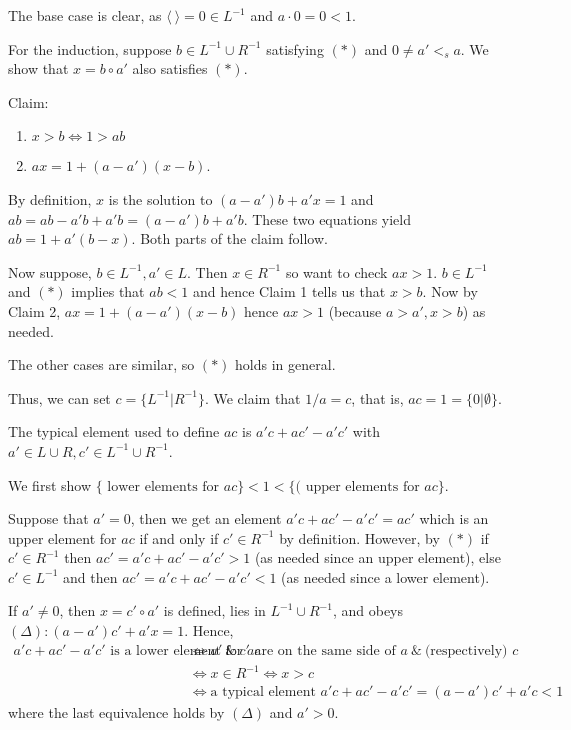The base case is clear, as $\langle \ \rangle = 0\in L^{-1}$ and $a\cdot 0 = 0 < 1$.

For the induction, suppose $b\in L^{-1}\cup R^{-1}$ satisfying $(*)$ and $0\neq a' <_s a$. We show that $x = b\circ a'$ also satisfies $(*)$.

Claim:
\begin{enumerate}
\item $x > b \Leftrightarrow 1 > ab$
\item $ax = 1 + (a-a')(x-b)$.
\end{enumerate}
By definition, $x$ is the solution to $(a-a')b + a'x = 1$ and $ab = ab - a'b + a'b = (a-a')b + a'b$. These two equations yield $ab = 1 + a'(b-x)$. Both parts of the claim follow.

Now suppose, $b\in L^{-1}, a'\in L$. Then $x\in R^{-1}$ so want to check $ax > 1$.
$b\in L^{-1}$ and $(*)$ implies that $ab < 1$ and hence Claim 1 tells us that $x > b$. Now by Claim 2, $ax = 1 + (a-a')(x-b)$ hence $ax > 1$ (because $a>a', x>b$) as needed.

The other cases are similar, so $(*)$ holds in general.

Thus, we can set $c = \{L^{-1} | R^{-1} \}$. We claim that $1/a = c$, that is, $ac = 1 = \{0 | \emptyset\}$.

The typical element used to define $ac$ is $a'c + ac' - a'c'$ with $a'\in L\cup R, c'\in L^{-1}\cup R^{-1}$.

We first show $\{\text{ lower elements for }ac\} < 1 < \{(\text{ upper elements for }ac \}$.

Suppose that $a' = 0$, then we get an element $a'c + ac' - a'c' = ac'$ which is an upper element for $ac$ if and only if $c'\in R^{-1}$ by definition. However, by $(*)$ if $c'\in R^{-1}$ then $ac' = a'c + ac' - a'c' > 1$ (as needed since an upper element), else $c'\in L^{-1}$ and then $ac' = a'c + ac' - a'c' < 1$ (as needed since a lower element).

If $a'\neq 0$, then $x = c'\circ a'$ is defined, lies in $L^{-1}\cup R^{-1}$, and obeys $(\Delta): (a-a')c' + a'x = 1$. Hence,
\begin{align*}
a'c + ac' - a'c' \text{ is a lower element for } ac &\Leftrightarrow a' \ \&\ c' \text{ are on the same side of } a \ \&\ \text{(respectively) } c \\
&\Leftrightarrow x\in R^{-1} \Leftrightarrow x > c \\
&\Leftrightarrow \text{a typical element } a'c + ac' - a'c' = (a-a')c' + a'c < 1
\end{align*}
where the last equivalence holds by $(\Delta)$ and $a'>0$.


